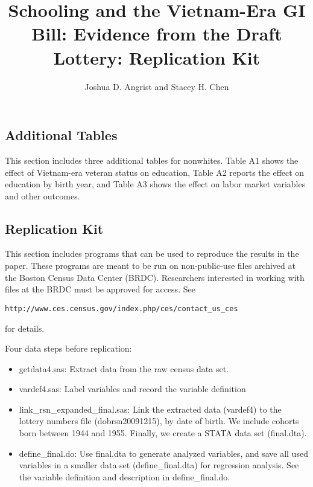 \documentclass[12pt]{article}
\begin{document}
\title{Schooling and the Vietnam-Era GI Bill: Evidence from the Draft
Lottery: Replication Kit}
\author{Joshua D. Angrist and Stacey H. Chen}
\maketitle

\subsection{Additional Tables}

This section includes three additional tables for nonwhites. Table A1 shows
the effect of Vietnam-era veteran status on education, Table A2 reports the
effect on education by birth year, and Table A3 shows the effect on labor
market variables and other outcomes.

\subsection{Replication Kit}

This section includes programs that can be used to reproduce the results in
the paper. These programs are meant to be run on non-public-use files
archived at the Boston Census Data Center (BRDC). Researchers interested in
working with files at the BRDC must be approved for access. See
\begin{verbatim}
http://www.ces.census.gov/index.php/ces/contact_us_ces
\end{verbatim}

for details.

Four data steps before replication:

\begin{itemize}
\item getdata4.sas: Extract data from the raw census data set.

\item vardef4.sas: Label variables and record the variable definition

\item link\_rsn\_expanded\_final.sas: Link the extracted data (vardef4) to
the lottery numbers file (dobrsn20091215), by date of birth. We include
cohorts born between 1944 and 1955. Finally, we create a STATA data set
(final.dta).

\item define\_final.do: Use final.dta to generate analyzed variables, and
save all used variables in a smaller data set (define\_final.dta) for
regression analysis. See the variable definition and description in
define\_final.do.
\end{itemize}
\end{document}
